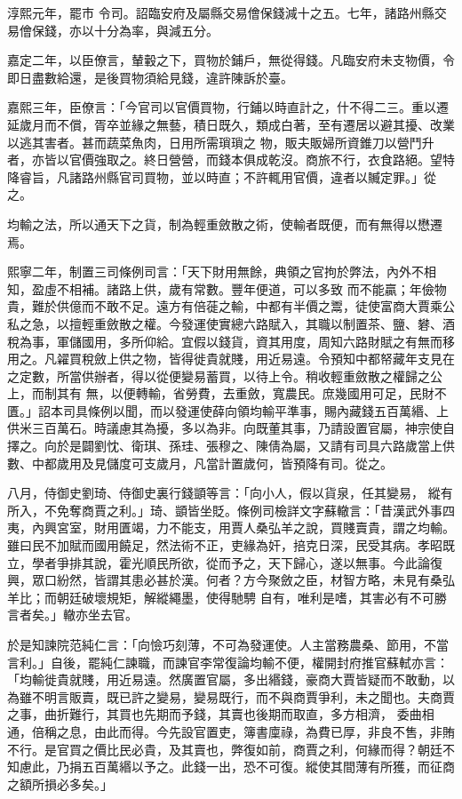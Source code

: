 \begin{pinyinscope}
 淳熙元年，罷市
 令司。詔臨安府及屬縣交易儈保錢減十之五。七年，諸路州縣交易儈保錢，亦以十分為率，與減五分。



 嘉定二年，以臣僚言，輦轂之下，買物於鋪戶，無從得錢。凡臨安府未支物價，令即日盡數給還，是後買物須給見錢，違許陳訴於臺。



 嘉熙三年，臣僚言：「今官司以官價買物，行鋪以時直計之，什不得二三。重以遷延歲月而不償，胥卒並緣之無藝，積日既久，類成白著，至有遷居以避其擾、改業以逃其害者。甚而蔬菜魚肉，日用所需瑣瑣之
 物，販夫販婦所資錐刀以營鬥升者，亦皆以官價強取之。終日營營，而錢本俱成乾沒。商旅不行，衣食路絕。望特降睿旨，凡諸路州縣官司買物，並以時直；不許輒用官價，違者以贓定罪。」從之。



 均輸之法，所以通天下之貨，制為輕重斂散之術，使輸者既便，而有無得以懋遷焉。



 熙寧二年，制置三司條例司言：「天下財用無餘，典領之官拘於弊法，內外不相知，盈虛不相補。諸路上供，歲有常數。豐年便道，可以多致
 而不能贏；年儉物貴，難於供億而不敢不足。遠方有倍蓰之輸，中都有半價之鬻，徒使富商大賈乘公私之急，以擅輕重斂散之權。今發運使實總六路賦入，其職以制置茶、鹽、礬、酒稅為事，軍儲國用，多所仰給。宜假以錢貨，資其用度，周知六路財賦之有無而移用之。凡糴買稅斂上供之物，皆得徙貴就賤，用近易遠。令預知中都帑藏年支見在之定數，所當供辦者，得以從便變易蓄買，以待上令。稍收輕重斂散之權歸之公上，而制其有
 無，以便轉輸，省勞費，去重斂，寬農民。庶幾國用可足，民財不匱。」詔本司具條例以聞，而以發運使薛向領均輸平準事，賜內藏錢五百萬緡、上供米三百萬石。時議慮其為擾，多以為非。向既董其事，乃請設置官屬，神宗使自擇之。向於是闢劉忱、衛琪、孫珪、張穆之、陳倩為屬，又請有司具六路歲當上供數、中都歲用及見儲度可支歲月，凡當計置歲何，皆預降有司。從之。



 八月，侍御史劉琦、侍御史裏行錢顗等言：「向小人，假以貨泉，任其變易，
 縱有所入，不免奪商賈之利。」琦、顗皆坐貶。條例司檢詳文字蘇轍言：「昔漢武外事四夷，內興宮室，財用匱竭，力不能支，用賈人桑弘羊之說，買賤賣貴，謂之均輸。雖曰民不加賦而國用饒足，然法術不正，吏緣為奸，掊克日深，民受其病。孝昭既立，學者爭排其說，霍光順民所欲，從而予之，天下歸心，遂以無事。今此論復興，眾口紛然，皆謂其患必甚於漢。何者？方今聚斂之臣，材智方略，未見有桑弘羊比；而朝廷破壞規矩，解縱繩墨，使得馳騁
 自有，唯利是嗜，其害必有不可勝言者矣。」轍亦坐去官。



 於是知諫院范純仁言：「向憸巧刻薄，不可為發運使。人主當務農桑、節用，不當言利。」自後，罷純仁諫職，而諫官李常復論均輸不便，權開封府推官蘇軾亦言：「均輸徙貴就賤，用近易遠。然廣置官屬，多出緡錢，豪商大賈皆疑而不敢動，以為雖不明言販賣，既已許之變易，變易既行，而不與商賈爭利，未之聞也。夫商賈之事，曲折難行，其買也先期而予錢，其賣也後期而取直，多方相濟，
 委曲相通，倍稱之息，由此而得。今先設官置吏，簿書廩祿，為費已厚，非良不售，非賄不行。是官買之價比民必貴，及其賣也，弊復如前，商賈之利，何緣而得？朝廷不知慮此，乃捐五百萬緡以予之。此錢一出，恐不可復。縱使其間薄有所獲，而征商之額所損必多矣。」




\end{pinyinscope}
